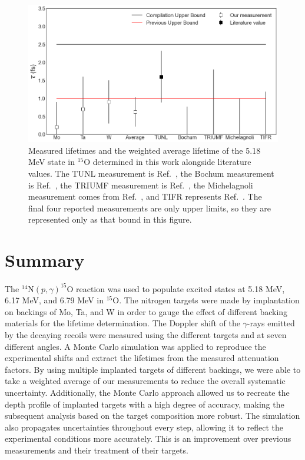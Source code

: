 \begin{figure}
\centering
\includegraphics[width=\linewidth]{figures/lifetimes679.png}
\caption{Measured lifetimes and the weighted average lifetime of the 5.18 MeV state in $^{15}$O determined in this work alongside literature values. The TUNL measurement is Ref.\ \cite{Bertone2001}, the Bochum measurement is Ref.\ \cite{Schurmann2008}, the TRIUMF measurement is Ref.\ \cite{Galinski2014}, the Michelagnoli measurement comes from Ref.\ \cite{Michelagnoli2013}, and TIFR represents Ref.\ \cite{Sharma2020}. The final four reported measurements are only upper limits, so they are represented only as that bound in this figure.}
\label{fig: lifetimes679}
\end{figure}


\section{Summary}
\label{sec: lifetimeSummary}

The $^{14}$N$(p,\gamma)^{15}$O reaction was used to populate excited states at 5.18 MeV, 6.17 MeV, and 6.79 MeV in $^{15}$O. The nitrogen targets were made by implantation on backings of Mo, Ta, and W in order to gauge the effect of different backing materials for the lifetime determination. The Doppler shift of the $\gamma$-rays emitted by the decaying recoils were measured using the different targets and at seven different angles. A Monte Carlo simulation was applied to reproduce the experimental shifts and extract the lifetimes from the measured attenuation factors. By using multiple implanted targets of different backings, we were able to take a weighted average of our measurements to reduce the overall systematic uncertainty. Additionally, the Monte Carlo approach allowed us to recreate the depth profile of implanted targets with a high degree of accuracy, making the subsequent analysis based on the target composition more robust. The simulation also propagates uncertainties throughout every step, allowing it to reflect the experimental conditions more accurately. This is an improvement over previous measurements and their treatment of their targets.


